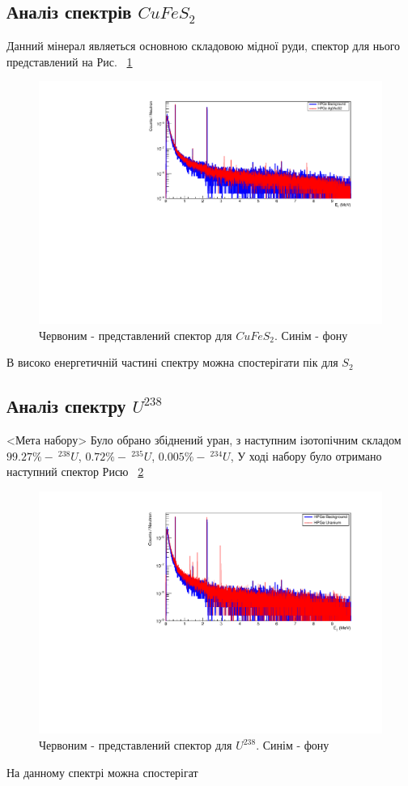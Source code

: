 \documentclass[a4paper, 14pt]{article}
\numberwithin{equation}{section}
\numberwithin{table}{section}
\begin{document}
\subsection{Аналіз спектрів $CuFeS_2$}
	Данний мінерал являеться основною складовою мідної руди, спектор для нього представлений на Рис. ~\ref{ris:CuFeS_2Fon}
	\begin{figure}[hbt!]
		\centering \includegraphics[width=1\textwidth]{res/smCuFeS2FonAll.pdf}
		\caption{Червоним - представлений спектор для $CuFeS_2$. Синім - фону} 
		\label{ris:CuFeS_2Fon}	
	\end{figure} 	
	В високо енергетичній частині спектру можна спостерігати пік для $S_2$
		
\subsection{Аналіз спектру $U^{238}$}
	<Мета набору> Було обрано збіднений уран, з наступним ізотопічним складом $99.27\% -\  ^{238}U$, $ 0.72\% - \  ^{235}U$, $ 0.005\% - \ ^{234}U$, У ході набору було отримано наступний спектор Рисю ~\ref{ris:poorU}
	\begin{figure}[hbt!]
		\centering \includegraphics[width=1\textwidth]{res/poorUranium.pdf}
		\caption{Червоним - представлений спектор для $U^{238}$. Синім - фону} 
		\label{ris:poorU}	
	\end{figure} 	 
	На данному спектрі можна спостерігат
	
\end{document}
